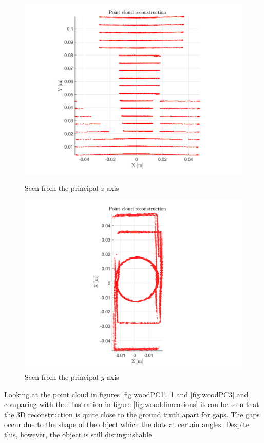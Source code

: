 \begin{figure}[H]
    \centering
    \begin{minipage}[t]{0.48\textwidth}
        \centering
        \includegraphics[width=1.25\textwidth]{figures/reconstruction/woodPC2.pdf}
        \caption{Seen from the principal $z$-axis}
    \label{fig:woodPC3}
    \end{minipage}%
    \hspace{.03\textwidth}
    \begin{minipage}[t]{0.48\textwidth}
        \centering
        \includegraphics[width=1.25\textwidth]{figures/reconstruction/woodPC3.pdf}
        \caption{Seen from the principal $y$-axis}
        \label{fig:woodPC2}
    \end{minipage}
\end{figure}

Looking at the point cloud in figures \ref{fig:woodPC1}, \ref{fig:woodPC2} and \ref{fig:woodPC3} and comparing with the illustration in figure \ref{fig:wooddimensions} it can be seen that the 3D reconstruction is quite close to the ground truth apart for gaps. The gaps occur due to the shape of the object which the dots at certain angles. Despite this, however, the object is still distinguishable.  
